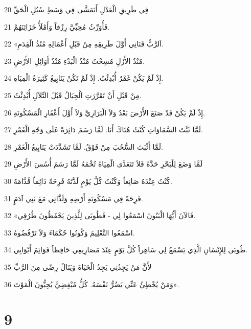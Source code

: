 \par 20 فِي طَرِيقِ الْعَدْلِ أَتَمَشَّى فِي وَسَطِ سُبُلِ الْحَقِّ
\par 21 فَأُوَرِّثُ مُحِبِّيَّ رِزْقاً وَأَمْلَأُ خَزَائِنَهُمْ.
\par 22 «اَلرَّبُّ قَنَانِي أَوَّلَ طَرِيقِهِ مِنْ قَبْلِ أَعْمَالِهِ مُنْذُ الْقِدَمِ.
\par 23 مُنْذُ الأَزَلِ مُسِحْتُ مُنْذُ الْبَدْءِ مُنْذُ أَوَائِلِ الأَرْضِ.
\par 24 إِذْ لَمْ يَكُنْ غَمْرٌ أُبْدِئْتُ. إِذْ لَمْ تَكُنْ يَنَابِيعُ كَثِيرَةُ الْمِيَاهِ.
\par 25 مِنْ قَبْلِ أَنْ تَقَرَّرَتِ الْجِبَالُ قَبْلَ التِّلاَلِ أُبْدِئْتُ.
\par 26 إِذْ لَمْ يَكُنْ قَدْ صَنَعَ الأَرْضَ بَعْدُ وَلاَ الْبَرَارِيَّ وَلاَ أَوَّلَ أَعْفَارِ الْمَسْكُونَةِ.
\par 27 لَمَّا ثَبَّتَ السَّمَاوَاتِ كُنْتُ هُنَاكَ أَنَا. لَمَّا رَسَمَ دَائِرَةً عَلَى وَجْهِ الْغَمْرِ.
\par 28 لَمَّا أَثْبَتَ السُّحُبَ مِنْ فَوْقُ. لَمَّا تَشَدَّدَتْ يَنَابِيعُ الْغَمْرِ.
\par 29 لَمَّا وَضَعَ لِلْبَحْرِ حَدَّهُ فَلاَ تَتَعَدَّى الْمِيَاهُ تُخْمَهُ لَمَّا رَسَمَ أُسُسَ الأَرْضِ
\par 30 كُنْتُ عِنْدَهُ صَانِعاً وَكُنْتُ كُلَّ يَوْمٍ لَذَّتَهُ فَرِحَةً دَائِماً قُدَّامَهُ.
\par 31 فَرِحَةً فِي مَسْكُونَةِ أَرْضِهِ وَلَذَّاتِي مَعَ بَنِي آدَمٍَ.
\par 32 «فَالآنَ أَيُّهَا الْبَنُونَ اسْمَعُوا لِي - فَطُوبَى لِلَّذِينَ يَحْفَظُونَ طُرُقِي.
\par 33 اسْمَعُوا التَّعْلِيمَ وَكُونُوا حُكَمَاءَ وَلاَ تَرْفُضُوهُ.
\par 34 طُوبَى لِلإِنْسَانِ الَّذِي يَسْمَعُ لِي سَاهِراً كُلَّ يَوْمٍ عِنْدَ مَصَارِيعِي حَافِظاً قَوَائِمَ أَبْوَابِي.
\par 35 لأَنَّ مَنْ يَجِدُنِي يَجِدُ الْحَيَاةَ وَيَنَالُ رِضًى مِنَ الرَّبِّ
\par 36 وَمَنْ يُخْطِئُ عَنِّي يَضُرُّ نَفْسَهُ. كُلُّ مُبْغِضِيَّ يُحِبُّونَ الْمَوْتَ».

\chapter{9}


